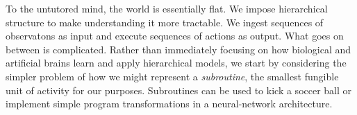 To the untutored mind, the world is essentially flat. We impose hierarchical structure to make understanding it more tractable. We ingest sequences of observatons as input and execute sequences of actions as output. What goes on between is complicated. Rather than immediately focusing on how biological and artificial brains learn and apply hierarchical models, we start by considering the simpler problem of how we might represent a {\it{subroutine}}, the smallest fungible unit of activity for our purposes. Subroutines can be used to kick a soccer ball or implement simple program transformations in a neural-network architecture.


